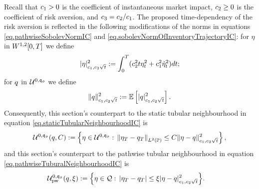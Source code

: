 \documentclass[10pt,a4paper]{article}
\begin{document}
	
	Recall that $\coeffMarketImpact>0$ is the coefficient of instantaneous market impact, $\coeffRiskAversion\geq 0$ is the coefficient of risk aversion, and $\ratioAversionOverImpact=\coeffRiskAversion/\coeffMarketImpact$. The proposed time-dependency of the risk aversion is reflected in the following modifications of the norms in equations \eqref{eq.pathwiseSobolevNormIC} and \eqref{eq.sobolevNormOfInventoryTrajectoryIC}: for $\eta$ in $\sobolevSpaceOneTwo\timeWindow$ we define
	\begin{equation}\label{eq.pathwiseSobolevNormTimeIC}
	\lvert \eta \rvert \squared _{\coeffMarketImpact,\coeffRiskAversion\sqrt{t}}:= \intZeroTimeHorizon (\coeffRiskAversion\squared t \eta\squared_t + \coeffMarketImpact\squared \dotEta\squared_t) dt;
	\end{equation}
	for $\inventory$ in $\spaceUnbiasedInventoryTrajectoriesInitialConstraint$ we define
	\begin{equation}\label{eq.sobolevNormTimeIC}
	\lVert \inventory \rVert\squared_{\coeffMarketImpact,\coeffRiskAversion\sqrt{t} }
	:=
	\Expectation \left[ \lvert \inventory \rvert_{\coeffMarketImpact,\coeffRiskAversion\sqrt{t}}\squared \right].
	\end{equation}
	Consequently, this section's counterpart to the static tubular neighbourhood in equation \eqref{eq.staticTubularNeighbourhoodIC} is  
	\begin{equation}\label{eq.staticTubularNeighbourhoodTimeIC}
	\spaceUnbiasedInventoryTrajectoriesInitialConstraint (\inventory, C):=
	\left\lbrace
	\eta \in \spaceUnbiasedInventoryTrajectoriesInitialConstraint: \, 
	\norm[\eta_\timeHorizon -\inventory_\timeHorizon]_{\Ltwo(\Prob)} \leq 
	C \lVert \eta -\inventory\rVert\squared_{\coeffMarketImpact,\coeffRiskAversion\sqrt{t} }
	\right\rbrace,
	\end{equation}
	and  this section's counterpart to the pathwise tubular neighbourhood in equation \eqref{eq.pathwiseTuburalNeighbourhoodIC} is 
	\begin{equation}
	\begin{split}\label{eq.pathwiseTubularNeighbourhoodTimeIC}
	\spaceUnbiasedInventoryTrajectoriesInitialConstraint_{\text{pw}}(\inventory,\xi):=
	\Big\lbrace
	\eta \in \spaceInventoryTrajectories: \, 
	\abs{\eta_\timeHorizon-\inventory_\timeHorizon} 
	&\leq \xi\lvert \eta - \inventory\rvert \squared_{\coeffMarketImpact,\coeffRiskAversion\sqrt{t} }
	\Big\rbrace.
	\end{split}
	\end{equation}
	
\end{document}

